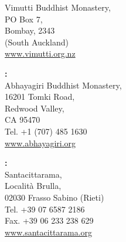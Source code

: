 {\begin{minipage}{0.8\linewidth}
\begin{multicols}{2}
{\vfill

Vimutti Buddhist Monastery,\\
PO Box 7,\\
Bombay, 2343\\
(South Auckland)\\
\href{http://www.vimutti.org.nz}{www.vimutti.org.nz}

\vfill

\textbf{\MakeUppercase{\textUnitedStates}:} \\
Abhayagiri Buddhist Monastery,\\
16201 Tomki Road,\\
Redwood Valley,\\
CA 95470\\
Tel. +1 (707) 485 1630\\
\href{http://www.abhayagiri.org}{www.abhayagiri.org}

\textbf{\MakeUppercase{\textItaly}:} \\
Santacittarama,\\
Località Brulla,\\
02030 Frasso Sabino (Rieti)\\
Tel. +39 07 6587 2186\\
Fax. +39 06 233 238 629\\
\href{http://www.santacittarama.org}{www.santacittarama.org}

% 

}

\end{multicols}
\end{minipage}

}
